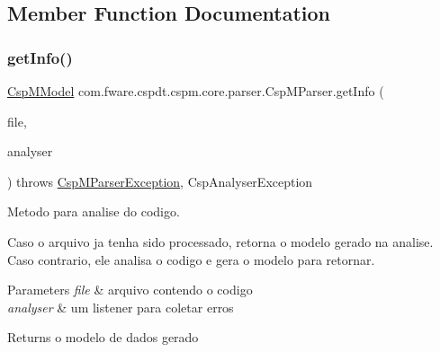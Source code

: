 \subsection{Member Function Documentation}
\mbox{\label{classcom_1_1fware_1_1cspdt_1_1cspm_1_1core_1_1parser_1_1_csp_m_parser_abcd9ef2aecf9c7a1de12da310357e831}} 
\subsubsection{\texorpdfstring{get\+Info()}{getInfo()}}
{\footnotesize\ttfamily \hyperlink{classcom_1_1fware_1_1cspdt_1_1cspm_1_1core_1_1model_1_1_csp_m_model}{Csp\+M\+Model} com.\+fware.\+cspdt.\+cspm.\+core.\+parser.\+Csp\+M\+Parser.\+get\+Info (\begin{DoxyParamCaption}\item[{I\+File}]{file,  }\item[{Csp\+Analyser\+Listener}]{analyser }\end{DoxyParamCaption}) throws \hyperlink{classcom_1_1fware_1_1cspdt_1_1cspm_1_1core_1_1parser_1_1_csp_m_parser_exception}{Csp\+M\+Parser\+Exception}, Csp\+Analyser\+Exception\hspace{0.3cm}{\ttfamily [inline]}}



Metodo para analise do codigo. 

Caso o arquivo ja tenha sido processado, retorna o modelo gerado na analise. Caso contrario, ele analisa o codigo e gera o modelo para retornar.


\begin{DoxyParams}{Parameters}
{\em file} & arquivo contendo o codigo \\
\hline
{\em analyser} & um listener para coletar erros\\
\hline
\end{DoxyParams}
\begin{DoxyReturn}{Returns}
o modelo de dados gerado
\end{DoxyReturn}

